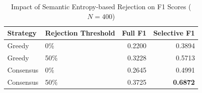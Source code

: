 \documentclass{article}
\begin{document}
\begin{table}[H]
\centering
\caption{Impact of Semantic Entropy-based Rejection on F1 Scores ($N=400$)}
\label{tab:se_rejection_stats}
\begin{tabular}{llrr}
\toprule
\textbf{Strategy} & \textbf{Rejection Threshold} & \textbf{Full F1} & \textbf{Selective F1} \\
\midrule
Greedy     & 0\%          & 0.2200 & 0.3894 \\
Greedy     & 50\%         & 0.3228 & 0.5713 \\
\midrule
Consensus  & 0\%          & 0.2645 & 0.4991 \\
Consensus  & 50\%         & 0.3725 & \textbf{0.6872} \\
\bottomrule
\end{tabular}
\end{table}
\end{document}

